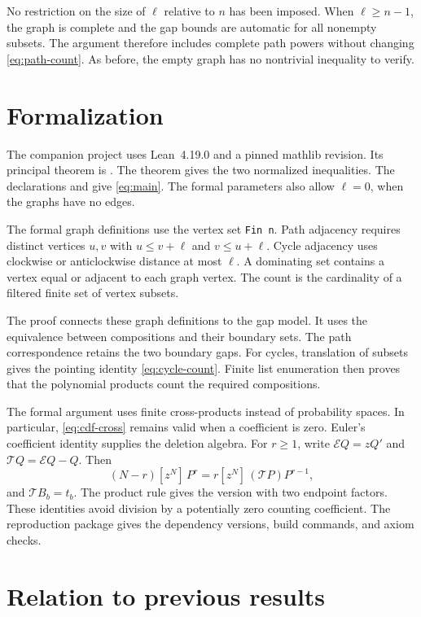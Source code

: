 \documentclass[11pt]{article}
\theoremstyle{definition}
\theoremstyle{remark}
\newcommand{\coef}[2]{[z^{#1}]\,#2}
\begin{document}
No restriction on the size of $\ell$ relative to $n$ has been imposed.
When $\ell\geq n-1$, the graph is complete and the gap bounds are
automatic for all nonempty subsets. The argument therefore includes
complete path powers without changing \eqref{eq:path-count}. As before,
the empty graph has no nontrivial inequality to verify.

\section{Formalization}\label{sec:formal}

The companion project uses Lean~4.19.0 and a pinned mathlib revision. Its principal theorem is . The theorem  gives the two normalized inequalities. The declarations  and  give \eqref{eq:main}. The formal parameters also allow $\ell=0$, when the graphs have no edges.

The formal graph definitions use the vertex set \texttt{Fin n}. Path adjacency requires distinct vertices $u,v$ with $u\leq v+\ell$ and $v\leq u+\ell$. Cycle adjacency uses clockwise or anticlockwise distance at most $\ell$. A dominating set contains a vertex equal or adjacent to each graph vertex. The count is the cardinality of a filtered finite set of vertex subsets.

The proof connects these graph definitions to the gap model. It uses the equivalence between compositions and their boundary sets. The path correspondence retains the two boundary gaps. For cycles, translation of subsets gives the pointing identity \eqref{eq:cycle-count}. Finite list enumeration then proves that the polynomial products count the required compositions.

The formal argument uses finite cross-products instead of probability spaces. In particular, \eqref{eq:cdf-cross} remains valid when a coefficient is zero. Euler's coefficient identity supplies the deletion algebra. For $r\geq1$, write $\mathcal E Q=zQ'$ and $\mathcal TQ=\mathcal E Q-Q$. Then
\[
 (N-r)\coef{N}{P^r}
 =r\coef{N}{(\mathcal TP)P^{r-1}},
\]
and $\mathcal TB_b=t_b$. The product rule gives the version with two endpoint factors. These identities avoid division by a potentially zero counting coefficient. The reproduction package gives the dependency versions, build commands, and axiom checks.

\section{Relation to previous results}
\end{document}
